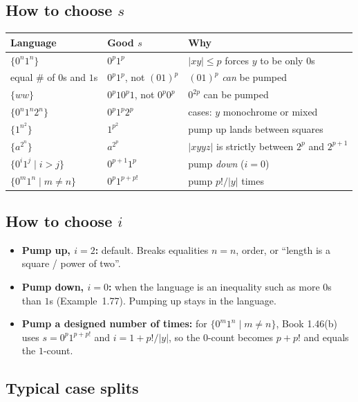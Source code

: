 \documentclass[11pt,a4paper]{article}
\begin{document}
\subsection{How to choose $s$}

\begin{center}
\begin{tabular}{@{}llp{6.6cm}@{}}
\toprule
Language & Good $s$ & Why \\
\midrule
$\{0^n1^n\}$ & $0^p1^p$ & $|xy|\le p$ forces $y$ to be only $0$s \\
equal $\#$ of $0$s and $1$s & $0^p1^p$, not $(01)^p$ &
$(01)^p$ \emph{can} be pumped \\
$\{ww\}$ & $0^p10^p1$, not $0^p0^p$ & $0^{2p}$ can be pumped \\
$\{0^n1^n2^n\}$ & $0^p1^p2^p$ & cases: $y$ monochrome or mixed \\
$\{1^{n^2}\}$ & $1^{p^2}$ & pump up lands between squares \\
$\{a^{2^n}\}$ & $a^{2^p}$ & $|xyyz|$ is strictly between $2^p$ and
$2^{p+1}$ \\
$\{0^i1^j\mid i>j\}$ & $0^{p+1}1^p$ & pump \emph{down} ($i=0$) \\
$\{0^m1^n\mid m\neq n\}$ & $0^p1^{p+p!}$ & pump $p!/|y|$ times \\
\bottomrule
\end{tabular}
\end{center}

\subsection{How to choose $i$}

\begin{itemize}[nosep]
  \item \textbf{Pump up, $i=2$:} default. Breaks equalities
        $n=n$, order, or ``length is a square / power of two''.
  \item \textbf{Pump down, $i=0$:} when the language is an inequality
        such as more $0$s than $1$s (Example~1.77). Pumping up stays
        in the language.
  \item \textbf{Pump a designed number of times:} for
        $\{0^m1^n\mid m\neq n\}$, Book 1.46(b) uses
        $s=0^p1^{p+p!}$ and $i=1+p!/|y|$, so the $0$-count becomes
        $p+p!$ and equals the $1$-count.
\end{itemize}

\subsection{Typical case splits}
\end{document}
